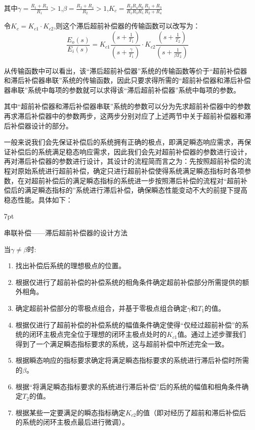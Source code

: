 \documentclass{article}
\numberwithin{equation}{section}
\numberwithin{figure}{section}
\newenvironment{formal}{%
\def\FrameCommand{%
\hspace{1pt}%
{\color{DarkBlue}\vrule width 2pt}%
{\color{formalshade}\vrule width 4pt}%
\colorbox{formalshade}%
}%
\MakeFramed{\advance\hsize-\width\FrameRestore}%
\noindent\hspace{-4.55pt}%
\begin{adjustwidth}{}{7pt}%
\vspace{2pt}\vspace{2pt}%
}
{%
\vspace{2pt}\end{adjustwidth}\endMakeFramed%
}
\begin{document}
其中$\gamma=\frac{R_1+R_3}{R_1}>1$,$\beta=\frac{R_2+R_4}{R_2}>1$,$K_c=\frac{R_2R_4R_6}{R_1R_3R_5}\frac{R_1+R_3}{R_2+R_4}$

令$K_c=K_{c1}·K_{c2}$,则这个滞后超前补偿器的传输函数可以改写为：
\begin{equation}
    \frac{E_o(s)}{E_i(s)}=K_{c1}\frac{(s+\frac{1}{T_1})}{(s+\frac{\gamma}{T_1})}·K_{c2}\frac{(s+\frac{1}{T_2})}{(s+\frac{1}{\beta T_2})}
\end{equation}

从传输函数中可以看出，该“滞后超前补偿器”系统的传输函数等价于“超前补偿器和滞后补偿器串联”系统的传输函数，因此只要求得所需的“超前补偿器和滞后补偿器串联”系统中每项的参数就可以求得该“滞后超前补偿器”系统中每项的参数。

其中“超前补偿器和滞后补偿器串联”系统的参数可以分为先求超前补偿器中的参数再求滞后补偿器中的参数两步，这两步分别对应了上述两节中关于超前补偿器和滞后补偿器设计的部分。

一般来说我们会先保证补偿后的系统拥有正确的极点，即满足瞬态响应需求，再保证补偿后的系统满足稳态响应需求，因此我们会先对超前补偿器的参数进行设计，再对滞后补偿器的参数进行设计，其设计的流程简而言之为：先按照超前补偿的流程对原始系统进行超前补偿，确定只进行超前补偿使得系统满足瞬态指标时各项参数，在对超前补偿后的满足瞬态指标的系统进一步按照滞后补偿的流程对“超前补偿后的满足瞬态指标的”系统进行滞后补偿，确保瞬态性能变动不大的前提下提高稳态性能。具体如下：

\begin{formal}
    串联补偿——滞后超前补偿器的设计方法
\end{formal}

当$\gamma\neq\beta$时:
\begin{enumerate}
    \item 找出补偿后系统的理想极点的位置。
    \item 根据仅进行了超前补偿的补偿系统的相角条件确定超前补偿部分所需提供的额外相角。
    \item 确定超前补偿部分的零极点组合，并基于零极点组合确定$\gamma$和$T_1$的值。
    \item 根据仅进行了超前补偿的补偿系统的幅值条件确定使得“仅经过超前补偿”的系统的闭环主极点完全位于理想的闭环主极点处时的$K_{c1}$值。通过上述步骤我们得到了一个满足瞬态指标要求的系统，这与超前补偿中所述完全一致。
    \item 根据瞬态响应的指标要求确定将满足瞬态指标要求的系统进行滞后补偿时所需的$\beta$。
    \item 根据“将满足瞬态指标要求的系统进行滞后补偿”后的系统的幅值和相角条件确定$T_2$的值。
    \item 根据某些一定要满足的瞬态指标确定$K_{c2}$的值（即对经历了超前和滞后补偿后的系统的闭环主极点最后进行微调）。
\end{enumerate}
\end{document}
